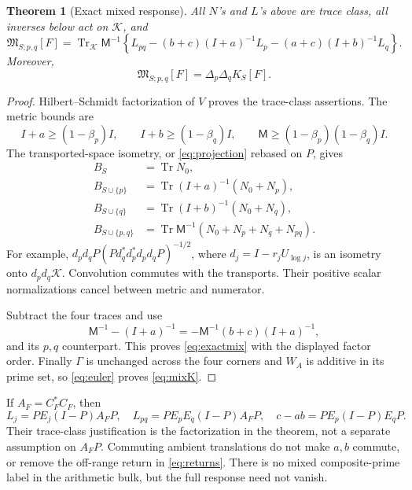\documentclass[11pt]{article}
\newtheorem{theorem}{Theorem}[section]
\theoremstyle{remark}
\newcommand{\KK}{\mathcal K}
\newcommand{\Mix}{\mathfrak M_{S;p,q}}
\DeclareMathOperator{\Tr}{Tr}
\numberwithin{equation}{section}
\begin{document}
\begin{theorem}[Exact mixed response]\label{thm:mixed}
All \(N\)'s and \(L\)'s above are trace class, all inverses below act on
\(\KK\), and
\begin{equation}\label{eq:exactmix}
 \boxed{\Mix[F]=\Tr_\KK\mathsf M^{-1}
  \left\{L_{pq}-(b+c)(I+a)^{-1}L_p
               -(a+c)(I+b)^{-1}L_q\right\}.}
\end{equation}
Moreover,
\begin{equation}\label{eq:mixK}
 \Mix[F]=\Delta_p\Delta_qK_S[F].
\end{equation}
\end{theorem}
\begin{proof}
Hilbert--Schmidt factorization of \(V\) proves the trace-class assertions.
The metric bounds are
\[
 I+a\ge(1-\beta_p)I,\qquad I+b\ge(1-\beta_q)I,\qquad
 \mathsf M\ge(1-\beta_p)(1-\beta_q)I.
\]
The transported-space isometry, or \eqref{eq:projection} rebased on \(P\),
gives
\begin{align*}
 B_S&=\Tr N_0,\\
 B_{S\cup\{p\}}&=\Tr(I+a)^{-1}(N_0+N_p),\\
 B_{S\cup\{q\}}&=\Tr(I+b)^{-1}(N_0+N_q),\\
 B_{S\cup\{p,q\}}&=\Tr\mathsf M^{-1}(N_0+N_p+N_q+N_{pq}).
\end{align*}
For example, \(d_pd_qP(Pd_q^*d_p^*d_pd_qP)^{-1/2}\), where
\(d_j=I-r_jU_{\log j}\), is an isometry onto \(d_pd_q\KK\).
Convolution commutes with the transports. Their positive scalar
normalizations cancel between metric and numerator.

Subtract the four traces and use
\[
 \mathsf M^{-1}-(I+a)^{-1}
   =-\mathsf M^{-1}(b+c)(I+a)^{-1},
\]
and its \(p,q\) counterpart. This proves \eqref{eq:exactmix} with the
displayed factor order. Finally \(\Gamma\) is unchanged across the four
corners and \(W_A\) is additive in its prime set, so
\eqref{eq:euler} proves \eqref{eq:mixK}.
\end{proof}

If \(A_F=C_F^*C_F\), then
\begin{equation}\label{eq:returns}
 L_j=PE_j(I-P)A_FP,\quad
 L_{pq}=PE_pE_q(I-P)A_FP,\quad
 c-ab=PE_p(I-P)E_qP .
\end{equation}
Their trace-class justification is the factorization in the theorem,
not a separate assumption on \(A_FP\). Commuting ambient translations
do not make \(a,b\) commute, or remove the off-range return in
\eqref{eq:returns}. There is no mixed composite-prime label in the
arithmetic bulk, but the full response need not vanish.
\end{document}
